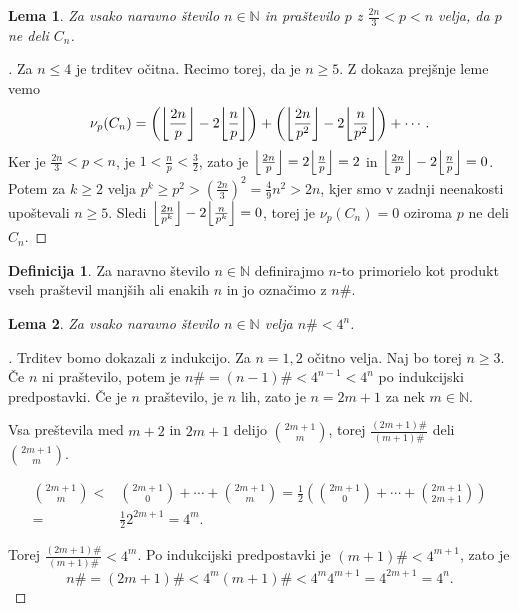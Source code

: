 \documentclass[a4paper,12pt]{article}
\def\N{\mathbb{N}}
\theoremstyle{definition}
\newtheorem{definicija}{Definicija}
\theoremstyle{plain}
\newtheorem{lema}{Lema}
\newenvironment{dokaz}{\begin{proof}[\bfseries\upshape\proofname]}{\end{proof}}
\DeclarePairedDelimiter\floor{\lfloor}{\rfloor}
\begin{document}
\begin{lema}
    \label{lema3}
    Za vsako naravno število $n \in \N$ in praštevilo $p$ z $\frac{2n}{3} < p < n$ velja, da $p$ ne deli $C_n$. 
\end{lema}
\begin{dokaz}
    Za $n \leq 4$ je trditev očitna. Recimo torej, da je $n \geq 5$. Z dokaza prejšnje leme vemo $$\nu_p(C_n) = \left( \floor*{\frac{2n}{p}} - 2\floor*{\frac{n}{p}} \right) + \left( \floor*{\frac{2n}{p^2}} - 2\floor*{\frac{n}{p^2}} \right) + \cdots.$$ Ker je $\frac{2n}{3} < p < n$, je $1 < \frac{n}{p} < \frac{3}{2}$, zato je $\floor*{\frac{2n}{p}} = 2\floor*{\frac{n}{p}} = 2$ in $\floor*{\frac{2n}{p}} - 2\floor*{\frac{n}{p}} = 0$. Potem za $k \geq 2$ velja $p^k \geq p^2 > (\frac{2n}{3})^2 = \frac{4}{9}n^2 > 2n$, kjer smo v zadnji neenakosti upoštevali $n \geq 5$. Sledi $\floor*{\frac{2n}{p^k}} - 2\floor*{\frac{n}{p^k}} = 0$, torej je $\nu_p(C_n) = 0$ oziroma $p$ ne deli $C_n$.
\end{dokaz}

\begin{definicija}
    Za naravno število $n \in \N$ definirajmo $n$-to primorielo kot produkt vseh praštevil manjših ali enakih $n$ in jo označimo z $n\#$.
\end{definicija}

\begin{lema}
    \label{lema4}
    Za vsako naravno število $n \in \N$ velja $n\# < 4^n$. 
\end{lema}
\begin{dokaz}
    Trditev bomo dokazali z indukcijo. Za $n = 1, 2$ očitno velja. Naj bo torej $n \geq 3$. Če $n$ ni praštevilo, potem je $n\# = (n - 1)\# < 4^{n - 1} < 4^n$ po indukcijski predpostavki. Če je $n$ praštevilo, je $n$ lih, zato je $n = 2m + 1$ za nek $m \in \N$.
    
    Vsa preštevila med $m + 2$ in $2m + 1$ delijo $\binom{2m + 1}{m}$, torej $\frac{(2m + 1)\#}{(m + 1)\#}$ deli $\binom{2m + 1}{m}$.

    \begin{align*}
        \binom{2m + 1}{m} <& \binom{2m + 1}{0} + \cdots + \binom{2m + 1}{m} = \frac{1}{2} \left( \binom{2m + 1}{0} + \cdots + \binom{2m + 1}{2m + 1} \right)\\ =& \frac{1}{2} 2^{2m + 1} = 4^m.
    \end{align*}

    Torej $\frac{(2m + 1)\#}{(m + 1)\#} < 4^m$. Po indukcijski predpostavki je $(m + 1)\# < 4^{m + 1}$, zato je $$n\# = (2m + 1)\# < 4^m (m + 1)\# < 4^m 4^{m + 1} = 4^{2m + 1} = 4^n.$$
\end{dokaz}
\end{document}
